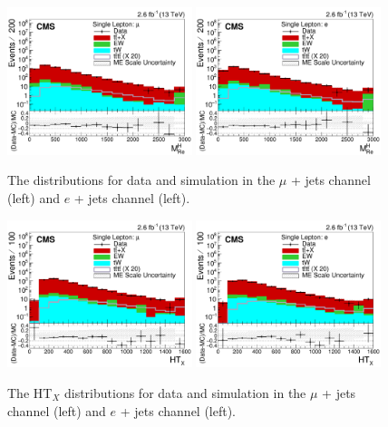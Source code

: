 \begin{figure}[ht!]
    \includegraphics[width=0.48\textwidth]{images/Run2/SumJetMassX_StackLogY.pdf}
    \includegraphics[width=0.48\textwidth]{images/Run2/SumJetMassX_StackLogY_e.pdf}
    \caption{The \redhadmass distributions for data and simulation in the $\mu$ + jets channel (left) and $e$ + jets channel (left).}
    \label{fig:SumJetMassX}
\end{figure}

\begin{figure}[ht!]
    \includegraphics[width=0.48\textwidth]{images/Run2/HTX_StackLogY.pdf}
    \includegraphics[width=0.48\textwidth]{images/Run2/HTX_StackLogY_e.pdf}
    \caption{The HT$_{X}$ distributions for data and simulation in the $\mu$ + jets channel (left) and $e$ + jets channel (left).}
    \label{fig:HTX}
\end{figure} 

